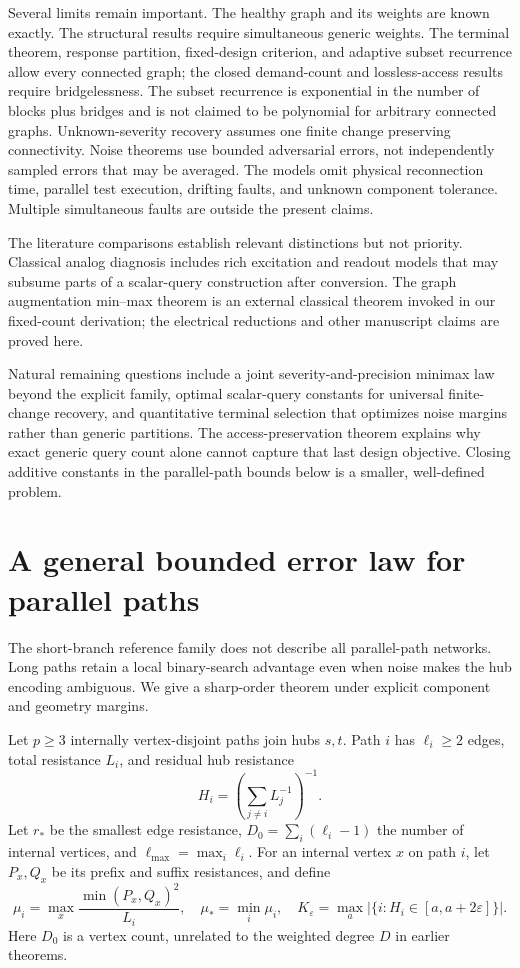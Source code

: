 \documentclass[11pt,letterpaper]{article}
\begin{document}
Several limits remain important. The healthy graph and its weights are known exactly. The structural results require simultaneous generic weights. The terminal theorem, response partition, fixed-design criterion, and adaptive subset recurrence allow every connected graph; the closed demand-count and lossless-access results require bridgelessness. The subset recurrence is exponential in the number of blocks plus bridges and is not claimed to be polynomial for arbitrary connected graphs. Unknown-severity recovery assumes one finite change preserving connectivity. Noise theorems use bounded adversarial errors, not independently sampled errors that may be averaged. The models omit physical reconnection time, parallel test execution, drifting faults, and unknown component tolerance. Multiple simultaneous faults are outside the present claims.

The literature comparisons establish relevant distinctions but not priority. Classical analog diagnosis includes rich excitation and readout models that may subsume parts of a scalar-query construction after conversion. The graph augmentation min--max theorem is an external classical theorem invoked in our fixed-count derivation; the electrical reductions and other manuscript claims are proved here.

Natural remaining questions include a joint severity-and-precision minimax law beyond the explicit family, optimal scalar-query constants for universal finite-change recovery, and quantitative terminal selection that optimizes noise margins rather than generic partitions. The access-preservation theorem explains why exact generic query count alone cannot capture that last design objective. Closing additive constants in the parallel-path bounds below is a smaller, well-defined problem.

\appendix
\section{A general bounded error law for parallel paths}\label{sec:parallel}
The short-branch reference family does not describe all parallel-path networks. Long paths retain a local binary-search advantage even when noise makes the hub encoding ambiguous. We give a sharp-order theorem under explicit component and geometry margins.

Let $p\ge3$ internally vertex-disjoint paths join hubs $s,t$. Path $i$ has $\ell_i\ge2$ edges, total resistance $L_i$, and residual hub resistance
\[
 H_i=\left(\sum_{j\ne i}L_j^{-1}\right)^{-1}.
\]
Let $r_*$ be the smallest edge resistance, $D_0=\sum_i(\ell_i-1)$ the number of internal vertices, and $\ell_{\max}=\max_i\ell_i$. For an internal vertex $x$ on path $i$, let $P_x,Q_x$ be its prefix and suffix resistances, and define
\[
 \mu_i=\max_x\frac{\min(P_x,Q_x)^2}{L_i},\quad
 \mu_*=\min_i\mu_i,\quad
 K_\varepsilon=\max_a|\{i:H_i\in[a,a+2\varepsilon]\}|.
\]
Here $D_0$ is a vertex count, unrelated to the weighted degree $D$ in earlier theorems.
\end{document}
